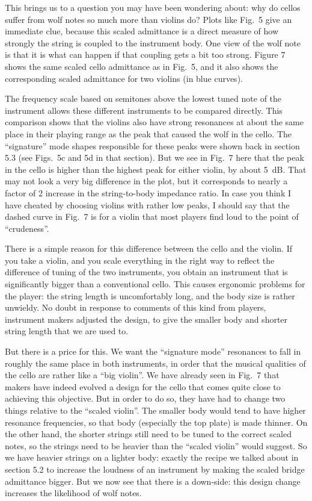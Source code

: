   This brings us to a question you may have been wondering about: why do cellos 
  suffer from wolf notes so much more than violins do? Plots like Fig.\ 5 give 
  an immediate clue, because this scaled admittance is a direct measure of how 
  strongly the string is coupled to the instrument body. One view of the wolf 
  note is that it is what can happen if that coupling gets a bit too strong. 
  Figure 7 shows the same scaled cello admittance as in Fig.\ 5, and it also 
  shows the corresponding scaled admittance for two violins (in blue curves). 

  The frequency scale based on semitones above the lowest tuned note of the 
  instrument allows these different instruments to be compared directly. This 
  comparison shows that the violins also have strong resonances at about the 
  same place in their playing range as the peak that caused the wolf in the 
  cello. The “signature” mode shapes responsible for these peaks were shown 
  back in section 5.3 (see Figs.\ 5c and 5d in that section). But we see in 
  Fig.\ 7 here that the peak in the cello is higher than the highest peak for 
  either violin, by about 5~dB. That may not look a very big difference in the 
  plot, but it corresponds to nearly a factor of 2 increase in the 
  string-to-body impedance ratio. In case you think I have cheated by choosing 
  violins with rather low peaks, I should say that the dashed curve in Fig.\ 7 
  is for a violin that most players find loud to the point of “crudeness”. 

  There is a simple reason for this difference between the cello and the 
  violin. If you take a violin, and you scale everything in the right way to 
  reflect the difference of tuning of the two instruments, you obtain an 
  instrument that is significantly bigger than a conventional cello. This 
  causes ergonomic problems for the player: the string length is uncomfortably 
  long, and the body size is rather unwieldy. No doubt in response to comments 
  of this kind from players, instrument makers adjusted the design, to give the 
  smaller body and shorter string length that we are used to. 

  But there is a price for this. We want the “signature mode” resonances to 
  fall in roughly the same place in both instruments, in order that the musical 
  qualities of the cello are rather like a “big violin”. We have already seen 
  in Fig.\ 7 that makers have indeed evolved a design for the cello that comes 
  quite close to achieving this objective. But in order to do so, they have had 
  to change two things relative to the “scaled violin”. The smaller body would 
  tend to have higher resonance frequencies, so that body (especially the top 
  plate) is made thinner. On the other hand, the shorter strings still need to 
  be tuned to the correct scaled notes, so the strings need to be heavier than 
  the “scaled violin” would suggest. So we have heavier strings on a lighter 
  body: exactly the recipe we talked about in section 5.2 to increase the 
  loudness of an instrument by making the scaled bridge admittance bigger. But 
  we now see that there is a down-side: this design change increases the 
  likelihood of wolf notes. 

